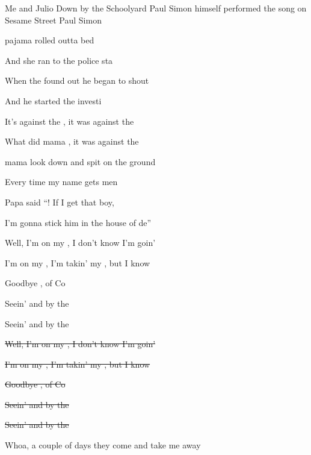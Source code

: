 \begin{SBSong}{Me and Julio Down by the Schoolyard}
  {Paul Simon himself performed the song on Sesame Street}
  {Paul Simon}
  \begin{SBVerse}
     pajama rolled outta bed

    And she ran to the police sta

    When the  found out he began to shout

    And he started the investi

    It's against the , it was against the 

    What did mama , it was against the 

     mama look down and spit on the ground

    Every time my name gets men

    Papa said ``! If I get that boy,

    I'm gonna stick him in the house of de''
  \end{SBVerse}
  \begin{SBChorus}
    Well, I'm on my , I don't know  I'm goin'

    I'm on my , I'm takin' my , but I  know 

    Goodbye , of Co

    Seein'  and   by the  

    Seein'  and   by the  
  \end{SBChorus}
  \begin{SBChorus}
    \sout{Well, I'm on my , I don't know  I'm goin'}

    \sout{I'm on my , I'm takin' my , but I  know }

    \sout{Goodbye , of Co}

    \sout{Seein'  and   by the  }

    \sout{Seein'  and   by the  }
  \end{SBChorus}
  \CBPageBrk
  \begin{SBVerse}
    Whoa,  a couple of days they come and take me away


\end{SBVerse}
\end{SBSong}
